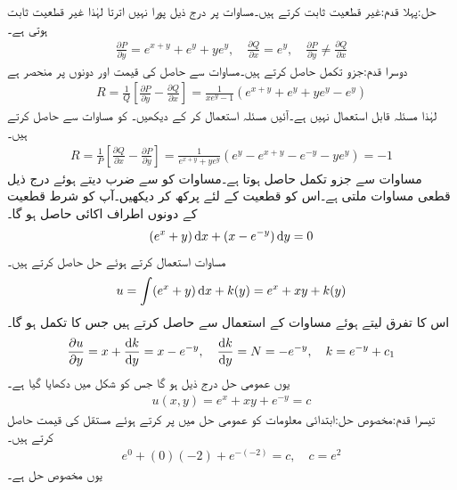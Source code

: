 حل:پہلا قدم:\quad غیر قطعیت ثابت کرتے ہیں۔مساوات  پر درج ذیل پورا نہیں اترتا لہٰذا غیر قطعیت ثابت ہوتی ہے۔
\begin{align*}
\frac{\partial P}{\partial y}=e^{x+y}+e^y+ye^y,\quad \frac{\partial Q}{\partial x}=e^y, \quad \frac{\partial P}{\partial y}\ne  \frac{\partial Q}{\partial x}
\end{align*} 
دوسرا قدم:\quad جزو تکمل حاصل کرتے ہیں۔مساوات  سے حاصل  کی قیمت  اور  دونوں پر منحصر ہے 
\begin{align*}
R=\frac{1}{Q}\left[ \frac{\partial P}{\partial y}-\frac{\partial Q}{\partial x}\right]=\frac{1}{xe^y-1}(e^{x+y}+e^y+ye^y-e^y)
\end{align*}
لہٰذا مسئلہ  قابل استعمال نہیں ہے۔آئیں مسئلہ  استعمال کر کے دیکھیں۔  کو مساوات  سے حاصل کرتے ہیں۔
\begin{align*}
R=\frac{1}{P}\left[ \frac{\partial Q}{\partial x}-\frac{\partial P}{\partial y}\right]=\frac{1}{e^{x+y}+ye^y}(e^y-e^{x+y}-e^{-y}-ye^y)=-1
\end{align*}
مساوات  سے جزو تکمل  حاصل ہوتا ہے۔مساوات  کو  سے ضرب دیتے ہوئے  درج ذیل قطعی مساوات ملتی ہے۔اس کو قطعیت کے لئے پرکھ کر دیکھیں۔آپ کو شرط قطعیت کے دونوں اطراف اکائی حاصل ہو گا۔
\begin{align*}
(e^{x}+y)\dif x+(x-e^{-y})\dif y=0
\end{align*}
مساوات  استعمال کرتے ہوئے حل حاصل کرتے ہیں۔
\begin{align*}
u=\int (e^{x}+y) \dif x+k(y)=e^x+xy+k(y)
\end{align*}
اس کا  تفرق لیتے ہوئے مساوات  کے استعمال سے  حاصل کرتے ہیں جس کا تکمل  ہو گا۔
\begin{align*}
\frac{\partial u}{\partial y}=x+\frac{\dif k}{\dif y}=x-e^{-y}, \quad \frac{\dif k}{\dif y}=N=-e^{-y}, \quad k=e^{-y}+c_1
\end{align*}
یوں عمومی حل درج ذیل ہو گا جس کو شکل  میں دکھایا گیا ہے۔
\begin{align}
u(x,y)=e^x+xy+e^{-y}=c
\end{align}
تیسرا قدم:مخصوص حل:\quad ابتدائی معلومات  کو عمومی حل میں پر کرتے ہوئے مستقل کی قیمت حاصل کرتے ہیں۔
\begin{align*}
e^0+(0)(-2)+e^{-(-2)}=c, \quad c=e^2
\end{align*}
یوں مخصوص حل  ہے۔

